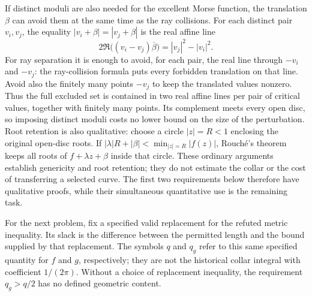 If distinct moduli are also needed for the excellent Morse function,
the translation $\beta$ can avoid them at the same time as the ray
collisions. For each distinct pair $v_i,v_j$, the equality
$|v_i+\beta|=|v_j+\beta|$ is the real affine line
\[
 2\Re\bigl((v_i-v_j)\overline\beta\bigr)=|v_j|^2-|v_i|^2.
\]
For ray separation it is enough to avoid, for each pair, the real line
through $-v_i$ and $-v_j$: the ray-collision formula puts every forbidden
translation on that line. Avoid also the finitely many points $-v_j$
to keep the translated values nonzero. Thus the full excluded set is
contained in two real affine lines per pair of critical values,
together with finitely many points. Its complement meets every open
disc, so imposing distinct moduli costs no lower bound on the size
of the perturbation.
Root retention is also qualitative: choose a circle $|z|=R<1$
enclosing the original open-disc roots. If
$|\lambda|R+|\beta|<\min_{|z|=R}|f(z)|$, Rouch\'e's theorem
keeps all roots of $f+\lambda z+\beta$ inside that circle.
These ordinary arguments establish genericity and root retention;
they do not estimate the collar or the cost of transferring a selected
curve. The first two requirements below therefore have qualitative
proofs, while their simultaneous quantitative use is the remaining task.

For the next problem, fix a specified valid replacement for the refuted
metric inequality. Its slack is the difference between the permitted
length and the bound supplied by that replacement. The symbols $q$ and
$q_g$ refer to this same specified quantity for $f$ and $g$, respectively;
they are not the historical collar integral with coefficient $1/(2\pi)$.
Without a choice of replacement inequality, the requirement $q_g>q/2$
has no defined geometric content.

